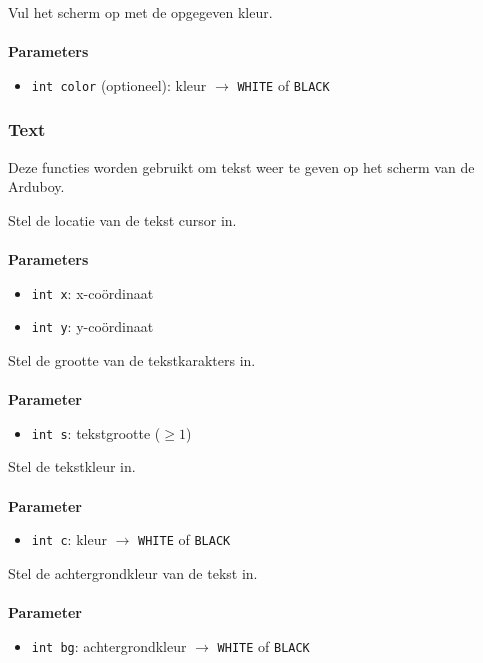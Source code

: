 \documentclass[11pt,fleqn]{book} %
\begin{document}
\begin{libf}[fillScreen(\emph{color=WHITE})]
	Vul het scherm op met de opgegeven kleur.\\ \\
	\textbf{Parameters}
	\begin{itemize}
		\item \texttt{int color} (optioneel): kleur $\rightarrow$ \texttt{WHITE} of \texttt{BLACK}
	\end{itemize}
\end{libf}

\subsubsection{Text}
Deze functies worden gebruikt om tekst weer te geven op het scherm van de Arduboy.

\begin{libf}[setCursor(x, y)]
	Stel de locatie van de tekst cursor in.\\ \\
	\textbf{Parameters}
	\begin{itemize}
		\item \texttt{int x}: x-coördinaat
		\item \texttt{int y}: y-coördinaat
	\end{itemize}
\end{libf}

\begin{libf}[setTextSize(s)]
	Stel de grootte van de tekstkarakters in.\\ \\
	\textbf{Parameter}
	\begin{itemize}
		\item \texttt{int s}: tekstgrootte ($\geq 1$)
	\end{itemize}
\end{libf}

\begin{libf}[setTextColor(c)]
	Stel de tekstkleur in.\\ \\
	\textbf{Parameter}
	\begin{itemize}
		\item \texttt{int c}: kleur $\rightarrow$ \texttt{WHITE} of \texttt{BLACK}
	\end{itemize}
\end{libf}

\begin{libf}[setTextBackground(bg)]
	Stel de achtergrondkleur van de tekst in.\\ \\
	\textbf{Parameter}
	\begin{itemize}
		\item \texttt{int bg}: achtergrondkleur $\rightarrow$ \texttt{WHITE} of \texttt{BLACK}
	\end{itemize}
\end{libf}
\end{document}
